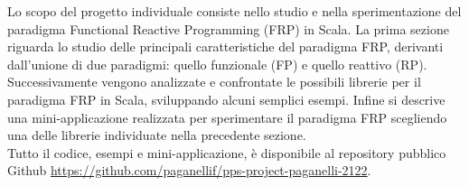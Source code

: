 \documentclass[../main.tex]{subfiles}
\begin{document}
Lo scopo del progetto individuale consiste nello studio e nella sperimentazione del paradigma Functional Reactive Programming (FRP) in Scala. La prima sezione riguarda lo studio delle principali caratteristiche del paradigma FRP, derivanti dall'unione di due paradigmi: quello funzionale (FP) e quello reattivo (RP). Successivamente vengono analizzate e confrontate le possibili librerie per il paradigma FRP in Scala, sviluppando alcuni semplici esempi. Infine si descrive una mini-applicazione realizzata per sperimentare il paradigma FRP scegliendo una delle librerie individuate nella precedente sezione. \\ 
Tutto il codice, esempi e mini-applicazione, è disponibile al repository pubblico Github \url{https://github.com/paganellif/pps-project-paganelli-2122}.
\end{document}
